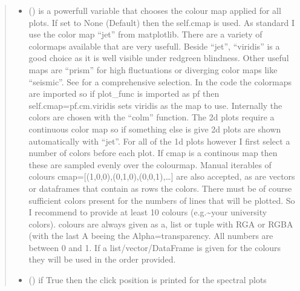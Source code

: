 \documentclass[letterpaper,10pt,english]{sphinxmanual}
\begin{document}
\begin{fulllineitems}
\begin{fulllineitems}
\begin{quote}
\begin{description}
\begin{itemize}
\item {} 
 (\sphinxstyleliteralemphasis{\sphinxupquote{, }}) \textendash{} is a powerfull variable that chooses the colour map applied for all plots. If set to
None (Default) then the self.cmap is used.
As standard I use the color map “jet” from matplotlib. There are a variety of colormaps
available that are very usefull. Beside “jet”, “viridis” is a good choice as it is well
visible under red\sphinxhyphen{}green blindness. Other useful maps are “prism” for high fluctuations
or diverging color maps like “seismic”.
See  for a comprehensive
selection. In the code the colormaps are imported so if plot\_func is imported as pf then
self.cmap=pf.cm.viridis sets viridis as the map to use. Internally the colors are chosen
with the “colm” function. The 2d plots require a continuous color map so if something
else is give 2d plots are shown automatically with “jet”. For all of the 1d plots however
I first select a number of colors before each plot. If cmap is a continous map then these
are sampled evenly over the colourmap. Manual iterables of colours
cmap={[}(1,0,0),(0,1,0),(0,0,1),…{]} are also accepted, as are vectors or dataframes that
contain as rows the colors. There must be of course sufficient colors present for
the numbers of lines that will be plotted. So I recommend to provide at least 10 colours
(e.g.\textasciitilde{}your university colors). colours are always given as a, list or tuple with RGA or RGBA
(with the last A beeing the Alpha=transparency. All numbers are between 0 and 1.
If a list/vector/DataFrame is given for the colours they will be used in the order provided.

\item {} 
 (\sphinxstyleliteralemphasis{\sphinxupquote{, }}) \textendash{} if True then the click position is printed for the spectral plots

\end{itemize}

\end{description}\end{quote}

\end{fulllineitems}
\end{fulllineitems}
\end{document}
